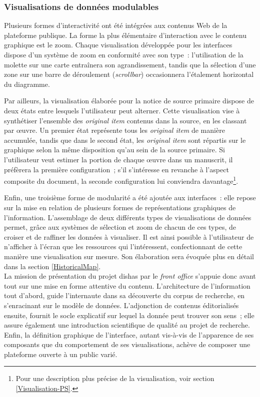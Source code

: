 \documentclass[a4paper,12pt,twoside]{book}
\newcommand{\eng}{\emph}
\newcommand{\oi}{\eng{original item}\xspace}
\newcommand{\fo}{\eng{front office}\xspace}
\newcommand{\dishas}{\gls{dishas}\xspace}
\begin{document}
			\subsubsection{Visualisations de données modulables}
Plusieurs formes d'interactivité ont été intégrées aux contenus Web de la plateforme publique. La forme la plus élémentaire d'interaction avec le contenu graphique est le zoom. Chaque visualisation développée pour les interfaces dispose d'un système de zoom en conformité avec son type~: l'utilisation de la molette sur une carte entraînera son agrandissement, tandis que la sélection d'une zone sur une barre de déroulement (\eng{scrollbar}) occasionnera l'étalement horizontal du diagramme.

Par ailleurs, la visualisation élaborée pour la notice de source primaire dispose de deux états entre lesquels l'utilisateur peut alterner. Cette visualisation vise à synthétiser l'ensemble des \oi contenus dans la source, en les classant par œuvre. Un premier état représente tous les \oi de manière accumulée, tandis que dans le second état, les \oi sont répartis sur le graphique selon la même disposition qu'au sein de la source primaire. Si l'utilisateur veut estimer la portion de chaque œuvre dans un manuscrit, il préfèrera la première configuration~; s'il s'intéresse en revanche à l'aspect composite du document, la seconde configuration lui conviendra davantage\footnote{Pour une description plus précise de la visualisation, voir section \ref{Visualisation-PS}.}.

Enfin, une troisième forme de modularité a été ajoutée aux interfaces~: elle repose sur la mise en relation de plusieurs formes de représentations graphiques de l'information. L'assemblage de deux différents types de visualisations de données permet, grâce aux systèmes de sélection et zoom de chacun de ces types, de croiser et de raffiner les données à visualiser. Il est ainsi possible à l'utilisateur de n'afficher à l'écran que les ressources qui l'intéressent, confectionnant de cette manière une visualisation sur mesure. Son élaboration sera évoquée plus en détail dans la section \ref{HistoricalMap}.\\

La mission de présentation du projet \dishas par le \fo s'appuie donc avant tout sur une mise en forme attentive du contenu. L'architecture de l'information tout d'abord, guide l'internaute dans sa découverte du corpus de recherche, en s'enracinant sur le modèle de données. L'adjonction de contenus éditorialisés ensuite, fournit le socle explicatif sur lequel la donnée peut trouver son sens~; elle assure également une introduction scientifique de qualité au projet de recherche. Enfin, la définition graphique de l'interface, autant vis-à-vis de l'apparence de ses composants que du comportement de ses visualisations, achève de composer une plateforme ouverte à un public varié.  
\end{document}
